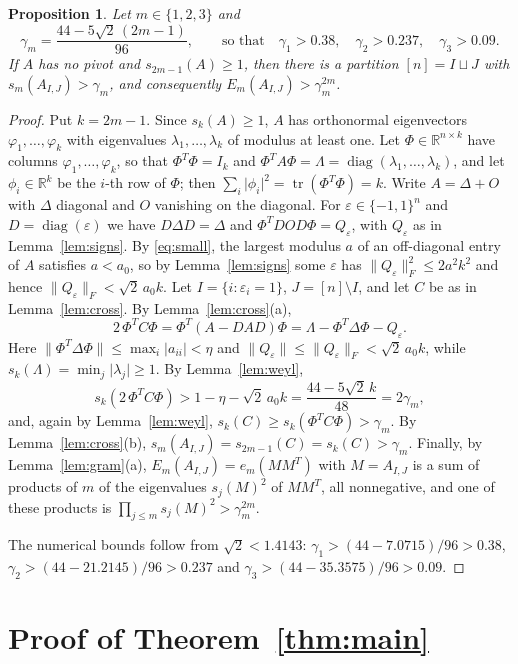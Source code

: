 \documentclass[11pt]{amsart}
\numberwithin{equation}{section}
\newtheorem{proposition}[theorem]{Proposition}
\theoremstyle{definition}
\theoremstyle{remark}
\newcommand{\R}{\mathbb R}
\newcommand{\1}{\mathbf 1}
\DeclareMathOperator{\diag}{diag}
\DeclareMathOperator{\tr}{tr}
\newcommand{\norm}[1]{\lVert #1\rVert}
\newcommand{\abs}[1]{\lvert #1\rvert}
\begin{document}
\begin{proposition}\label{prop:signs}
Let $m\in\{1,2,3\}$ and
\[
\gamma_m=\frac{44-5\sqrt2\,(2m-1)}{96},\qquad\text{so that}\quad\gamma_1>0.38,\quad\gamma_2>0.237,\quad\gamma_3>0.09 .
\]
If $A$ has no pivot and $s_{2m-1}(A)\ge1$, then there is a partition $[n]=I\sqcup J$ with $s_m(A_{I,J})>\gamma_m$, and consequently $E_m(A_{I,J})>\gamma_m^{2m}$.
\end{proposition}

\begin{proof}
Put $k=2m-1$. Since $s_k(A)\ge1$, $A$ has orthonormal eigenvectors $\varphi_1,\dots,\varphi_k$ with eigenvalues $\lambda_1,\dots,\lambda_k$ of modulus at least one. Let $\Phi\in\R^{n\times k}$ have columns $\varphi_1,\dots,\varphi_k$, so that $\Phi^T\Phi=I_k$ and $\Phi^TA\Phi=\Lambda=\diag(\lambda_1,\dots,\lambda_k)$, and let $\phi_i\in\R^k$ be the $i$-th row of $\Phi$; then $\sum_i\abs{\phi_i}^2=\tr(\Phi^T\Phi)=k$. Write $A=\Delta+O$ with $\Delta$ diagonal and $O$ vanishing on the diagonal. For $\varepsilon\in\{-1,1\}^n$ and $D=\diag(\varepsilon)$ we have $D\Delta D=\Delta$ and $\Phi^TDOD\Phi=Q_\varepsilon$, with $Q_\varepsilon$ as in Lemma~\ref{lem:signs}. By \eqref{eq:small}, the largest modulus $a$ of an off-diagonal entry of $A$ satisfies $a<a_0$, so by Lemma~\ref{lem:signs} some $\varepsilon$ has $\norm{Q_\varepsilon}_F^2\le2a^2k^2$ and hence $\norm{Q_\varepsilon}_F<\sqrt2\,a_0k$. Let $I=\{i:\varepsilon_i=1\}$, $J=[n]\setminus I$, and let $C$ be as in Lemma~\ref{lem:cross}. By Lemma~\ref{lem:cross}(a),
\[
2\,\Phi^TC\Phi=\Phi^T(A-DAD)\Phi=\Lambda-\Phi^T\Delta\Phi-Q_\varepsilon .
\]
Here $\norm{\Phi^T\Delta\Phi}\le\max_i\abs{a_{ii}}<\eta$ and $\norm{Q_\varepsilon}\le\norm{Q_\varepsilon}_F<\sqrt2\,a_0k$, while $s_k(\Lambda)=\min_j\abs{\lambda_j}\ge1$. By Lemma~\ref{lem:weyl},
\[
s_k(2\,\Phi^TC\Phi)>1-\eta-\sqrt2\,a_0k=\frac{44-5\sqrt2\,k}{48}=2\gamma_m ,
\]
and, again by Lemma~\ref{lem:weyl}, $s_k(C)\ge s_k(\Phi^TC\Phi)>\gamma_m$. By Lemma~\ref{lem:cross}(b), $s_m(A_{I,J})=s_{2m-1}(C)=s_k(C)>\gamma_m$. Finally, by Lemma~\ref{lem:gram}(a), $E_m(A_{I,J})=e_m(MM^T)$ with $M=A_{I,J}$ is a sum of products of $m$ of the eigenvalues $s_j(M)^2$ of $MM^T$, all nonnegative, and one of these products is $\prod_{j\le m}s_j(M)^2>\gamma_m^{2m}$.

The numerical bounds follow from $\sqrt2<1.4143$: $\gamma_1>(44-7.0715)/96>0.38$, $\gamma_2>(44-21.2145)/96>0.237$ and $\gamma_3>(44-35.3575)/96>0.09$.
\end{proof}

\section{Proof of Theorem~\ref{thm:main}}\label{sec:proof}
\end{document}
